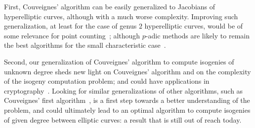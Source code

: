 First, Couveignes' algorithm can be easily generalized to Jacobians of
hyperelliptic curves, although with a much worse complexity. Improving
such generalization, at least for the case of genus $2$ hyperelliptic
curves, would be of some relevance for point
counting~\cite{schoof95,pila90,gaudry+schost04}; although $p$-adic
methods are likely to remain the best algorithms for the small
characteristic case~\cite{kedlaya01,denef+vercauteren06}. 

Second, our generalization of Couveignes' algorithm to compute
isogenies of unknown degree sheds new light on Couveignes' algorithm
and on the complexity of the isogeny computation problem; and could
have applications in
cryptography~\cite{teske06,rostovtsev+stolbunov06}.  Looking for
similar generalizations of other algorithms, such as Couveignes' first
algorithm~\cite{couveignes94}, is a first step towards a better
understanding of the problem, and could ultimately lead to an optimal
algorithm to compute isogenies of given degree between elliptic
curves: a result that is still out of reach today.



